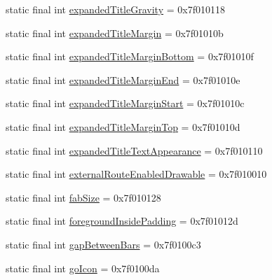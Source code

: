\begin{CompactItemize}
static final int \hyperlink{classandroid_1_1support_1_1graphics_1_1drawable_1_1animated_1_1_r_1_1attr_1794566dd8d333d9015c5a45cf356799}{expandedTitleGravity} = 0x7f010118
\item 
static final int \hyperlink{classandroid_1_1support_1_1graphics_1_1drawable_1_1animated_1_1_r_1_1attr_54fb213e14ae162bd101111d901a24e5}{expandedTitleMargin} = 0x7f01010b
\item 
static final int \hyperlink{classandroid_1_1support_1_1graphics_1_1drawable_1_1animated_1_1_r_1_1attr_532b3aedbfd99b39bc906a505621d700}{expandedTitleMarginBottom} = 0x7f01010f
\item 
static final int \hyperlink{classandroid_1_1support_1_1graphics_1_1drawable_1_1animated_1_1_r_1_1attr_94b9e9902fd14a03c838859651c7d857}{expandedTitleMarginEnd} = 0x7f01010e
\item 
static final int \hyperlink{classandroid_1_1support_1_1graphics_1_1drawable_1_1animated_1_1_r_1_1attr_1aebd92bf196bed3950d3dd1addee9e7}{expandedTitleMarginStart} = 0x7f01010c
\item 
static final int \hyperlink{classandroid_1_1support_1_1graphics_1_1drawable_1_1animated_1_1_r_1_1attr_c394754c8c50108d206d32f89c2a8083}{expandedTitleMarginTop} = 0x7f01010d
\item 
static final int \hyperlink{classandroid_1_1support_1_1graphics_1_1drawable_1_1animated_1_1_r_1_1attr_2c707d8c485857181a84c1b88a5f24bc}{expandedTitleTextAppearance} = 0x7f010110
\item 
static final int \hyperlink{classandroid_1_1support_1_1graphics_1_1drawable_1_1animated_1_1_r_1_1attr_b856377396eebb870b0311bc6a81b14b}{externalRouteEnabledDrawable} = 0x7f010010
\item 
static final int \hyperlink{classandroid_1_1support_1_1graphics_1_1drawable_1_1animated_1_1_r_1_1attr_772a1e56e15e35730b775321c9b00ff5}{fabSize} = 0x7f010128
\item 
static final int \hyperlink{classandroid_1_1support_1_1graphics_1_1drawable_1_1animated_1_1_r_1_1attr_716d491a87081a21f76b8d52324200c6}{foregroundInsidePadding} = 0x7f01012d
\item 
static final int \hyperlink{classandroid_1_1support_1_1graphics_1_1drawable_1_1animated_1_1_r_1_1attr_3f99d6b05fc1f5987f483ad212cb3b76}{gapBetweenBars} = 0x7f0100c3
\item 
static final int \hyperlink{classandroid_1_1support_1_1graphics_1_1drawable_1_1animated_1_1_r_1_1attr_d5bbd9c46694798d66e484777698a07b}{goIcon} = 0x7f0100da
\item 

\end{CompactItemize}
